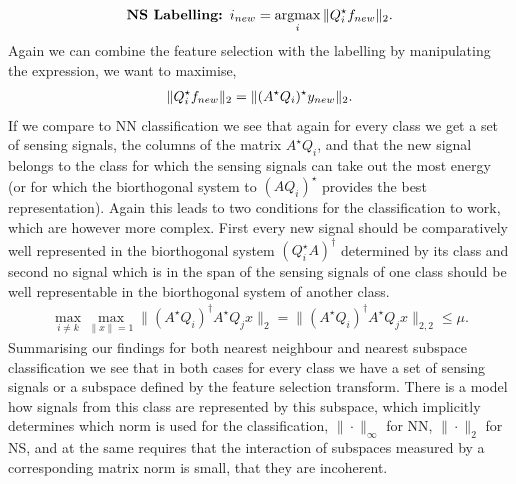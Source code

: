 \documentclass[11pt]{article}
\begin{document}
\begin{align}
\mbox{\bf NS Labelling: } i_{new}=\operatorname*{argmax}_i \|Q_i^\star {{f}_{new}}\|_2.
\end{align}
Again we can combine the feature selection with the labelling by manipulating the expression, we want to maximise,
\begin{align}
\|Q_i^\star {{f}_{new}}\|_2 = \| (A^\star Q_i)^\star {{y}_{new}} \|_2 . \notag
\end{align}
If we compare to NN classification we see that again for every class we get a set of sensing signals, the columns of the matrix $A^\star Q_i$, and that the new signal belongs to the class for which the sensing signals can take out the most energy (or for which the biorthogonal system to $(AQ_i)^\star$ provides the best representation). Again this leads to two conditions for the classification to work, which are however more complex. First every new signal should be comparatively well represented in the biorthogonal system $(Q_i^\star A)^\dagger$ determined by its class and second no signal which is in the span of the sensing signals of one class should be well representable in the biorthogonal system of another class.
\begin{align}
\max_{i\neq k} \max_{\|x\|=1}\|(A^\star Q_i)^\dagger A^\star Q_j x\|_2 = \|(A^\star Q_i)^\dagger A^\star Q_j x\|_{2,2}  \leq \mu .
\end{align}
Summarising our findings for both nearest neighbour and nearest subspace classification we see that in both cases for every class we have a set of sensing signals or a subspace defined by the feature selection transform. There is a model how signals from this class are represented by this subspace, which implicitly determines which norm is used for the classification, $\|\cdot\|_\infty$ for NN, $\|\cdot\|_2$ for NS, and at the same requires that the interaction of subspaces measured by a corresponding matrix norm is small, \ie that they are incoherent.\\
\end{document}
